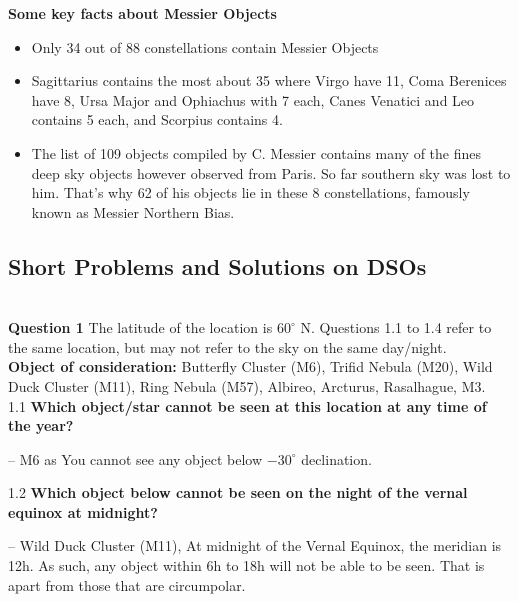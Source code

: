 \documentclass[a4paper,12pt]{extarticle}
\begin{document}
\textbf{Some key facts about Messier Objects}
\begin{itemize}
    \item Only 34 out of 88 constellations contain Messier Objects
    \item Sagittarius contains the most about 35 where Virgo have 11, Coma Berenices have 8, Ursa Major and Ophiachus with 7 each, Canes Venatici and Leo contains 5 each, and Scorpius contains 4.
    \item The list of 109 objects compiled by C. Messier contains many of the fines deep sky objects however observed from Paris. So far southern sky was lost to him. That's why 62 of his objects lie in these 8 constellations, famously known as Messier Northern Bias. 
\end{itemize}

\clearpage 
\subsection{Short Problems and Solutions on DSOs}

\\


\textsf{\textbf{Question 1}} The latitude of the location is $60^\circ$ N. Questions 1.1 to 1.4 refer to the same location, but may not refer to the sky on the same day/night. \\

\textbf{Object of consideration:} Butterfly Cluster (M6), Trifid Nebula (M20), Wild Duck Cluster (M11), Ring Nebula (M57), Albireo, Arcturus, Rasalhague, M3.\\

1.1 \textbf{Which object/star cannot be seen at this location at any time of the year?}
\begin{sol}
    -- M6 as You cannot see any object below $-30^\circ$ declination.
\end{sol}

    
1.2  \textbf{Which object below cannot be seen on the night of the vernal equinox at midnight?}
\begin{sol}
    -- Wild Duck Cluster (M11), At midnight of the Vernal Equinox, the meridian is 12h. As such, any object within 6h to 18h will not be able to be seen. That is apart from those that are circumpolar.	
\end{sol}
\end{document}
